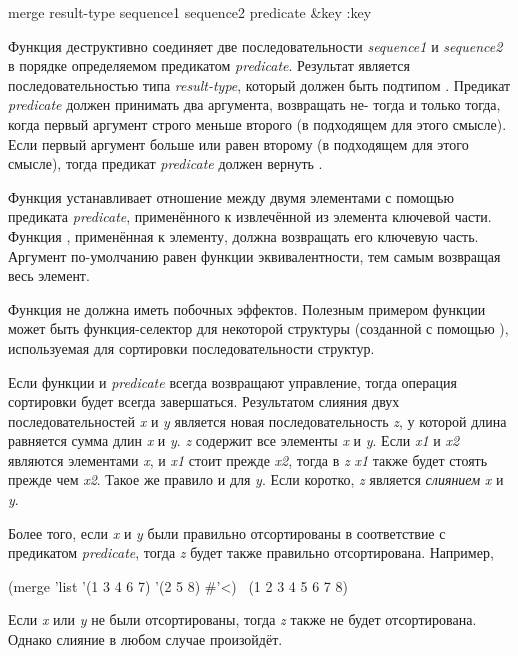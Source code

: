 \begin{defun}[Функция]
merge result-type sequence1 sequence2 predicate &key :key

Функция деструктивно соединяет две последовательности \emph{sequence1} и
\emph{sequence2} в порядке определяемом предикатом \emph{predicate}.
Результат является последовательностью типа \emph{result-type}, который должен
быть подтипом .
Предикат \emph{predicate} должен принимать два аргумента,
возвращать не-{\false} тогда и только тогда, когда первый аргумент строго меньше
второго (в подходящем для этого смысле).
Если первый аргумент больше или равен второму (в подходящем для этого смысле),
тогда предикат \emph{predicate} должен вернуть {\false}.

Функция  устанавливает отношение между двумя элементами с помощью
предиката \emph{predicate}, применённого к извлечённой из элемента ключевой
части. Функция , применённая к элементу, должна возвращать его ключевую
часть.
Аргумент  по-умолчанию равен функции эквивалентности, тем самым
возвращая весь элемент.

Функция  не должна иметь побочных эффектов.
Полезным примером функции  может быть функция-селектор для некоторой
структуры (созданной с помощью ), используемая для сортировки
последовательности структур.

Если функции  и \emph{predicate} всегда возвращают управление, тогда
операция сортировки будет всегда завершаться.
Результатом слияния двух последовательностей \emph{x} и \emph{y} является новая
последовательность \emph{z}, у которой длина равняется сумма длин \emph{x} и
\emph{y}. \emph{z} содержит все элементы \emph{x} и \emph{y}.
Если \emph{x1} и \emph{x2} являются элементами \emph{x}, и \emph{x1} стоит
прежде \emph{x2}, тогда в \emph{z} \emph{x1} также будет стоять прежде чем
\emph{x2}. Такое же правило и для \emph{y}. Если коротко, \emph{z} является
\emph{слиянием} \emph{x} и \emph{y}.

Более того, если \emph{x} и \emph{y} были правильно отсортированы в соответствие
с предикатом \emph{predicate}, тогда \emph{z} будет также правильно
отсортирована. Например,
\begin{lisp}
(merge 'list '(1 3 4 6 7) '(2 5 8) \#'<) \EV\ (1 2 3 4 5 6 7 8)
\end{lisp}
Если \emph{x} или \emph{y} не были отсортированы, тогда \emph{z} также не будет
отсортирована. Однако слияние в любом случае произойдёт.


\end{defun}
